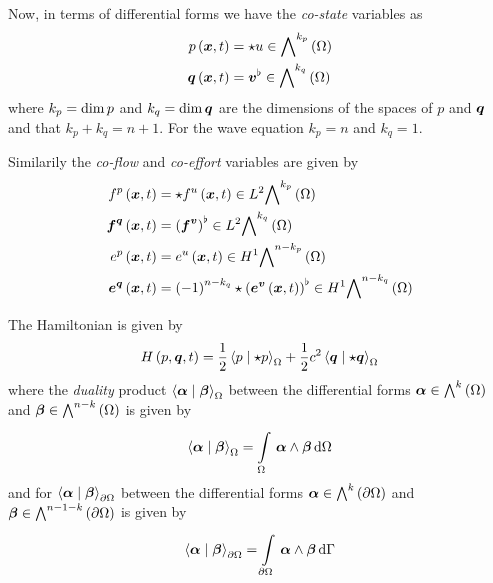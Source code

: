 Now, in terms of differential forms we have the \emph{co-state} variables as
\begin{equation}
  \begin{aligned}
    \fnof{p}{\vectr{x},t}&=\hodgestar{u}\in\diffformspace{k_{p}}{\Omega} \\
    \fnof{\covectr{q}}{\vectr{x},t}&=\flattensor{\vectr{v}}\in\diffformspace{k_{q}}{\Omega}
  \end{aligned}
\end{equation}
where $k_{p}=\operatorname{dim} p$ and $k_{q}=\operatorname{dim}  \boldsymbol{q} $ are the dimensions of the spaces of $p$ and $ \boldsymbol{q} $ and
that $k_{p}+k_{q}=n+1$. For the wave equation $k_{p}=n$ and $k_{q}=1$.

Similarily the \emph{co-flow} and \emph{co-effort} variables are given by
\begin{equation}
  \begin{aligned}
    \fnof{f^{p}}{\vectr{x},t}&=\hodgestar{\fnof{f^{u}}{\vectr{x},t}}\in\ltwodiffformspace{k_{p}}{\Omega}\\
    \fnof{\covectr{f}^{\covectr{q}}}{\vectr{x},t}&=\flattensor{\pbrac{\vectr{f}^{\vectr{v}}}}\in\ltwodiffformspace{k_{q}}{\Omega}\\
    \fnof{e^{p}}{\vectr{x},t}&=\fnof{e^{u}}{\vectr{x},t}\in\honediffformspace{n-k_{p}}{\Omega}\\
    \fnof{\covectr{e}^{\covectr{q}}}{\vectr{x},t}&=\pbrac{-1}^{n-k_{q}}\hodgestar{\flattensor{\pbrac{\fnof{\vectr{e}^{\vectr{v}}}{\vectr{x},t}}}}\in\honediffformspace{n-k_{q}}{\Omega}
  \end{aligned} 
\end{equation}

The Hamiltonian is given by
\begin{equation}
  \hamiltonian{p,\covectr{q},t}=\dfrac{1}{2}\dualityform{p}{\hodgestar{p}}{\Omega}+\dfrac{1}{2}c^{2}\dualityform{\covectr{q}}{\hodgestar{\covectr{q}}}{\Omega}
\end{equation}
where the \emph{duality} product
$\dualityform{\covectr{\alpha}}{\covectr{\beta}}{\Omega}$ between the differential
forms $\covectr{\alpha}\in\diffformspace{k}{\Omega}$ and
$\covectr{\beta}\in\diffformspace{n-k}{\Omega}$ is given by
\begin{equation}
  \dualityform{\covectr{\alpha}}{\covectr{\beta}}{\Omega}=\gint{\Omega}{}{\wedgeprod{\covectr{\alpha}}{\covectr{\beta}}}{\Omega}
\end{equation}
and for $\dualityform{\covectr{\alpha}}{\covectr{\beta}}{\boundary{\Omega}}$
between the differential forms $\covectr{\alpha}\in\diffformspace{k}{\boundary{\Omega}}$ and
$\covectr{\beta}\in\diffformspace{n-1-k}{\boundary{\Omega}}$ is given by
\begin{equation}
  \dualityform{\covectr{\alpha}}{\covectr{\beta}}{\boundary{\Omega}}=\gint{\boundary{\Omega}}{}{\wedgeprod{\covectr{\alpha}}{\covectr{\beta}}}{\Gamma}
\end{equation}

